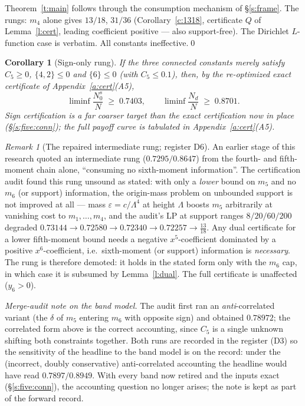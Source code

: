\documentclass[11pt]{article}
\numberwithin{equation}{section}
\newtheorem{corollary}[theorem]{Corollary}
\theoremstyle{definition}
\theoremstyle{remark}
\newtheorem{remark}[theorem]{Remark}
\begin{document}
Theorem~\ref{t:main} follows through the consumption mechanism of
\S\ref{s:frame}. The rungs: $m_4$ alone gives $13/18$, $31/36$
(Corollary~\ref{c:1318}, certificate $Q$ of Lemma~\ref{l:cert},
leading coefficient positive --- also support-free). The
Dirichlet $L$-function case is verbatim. All constants
ineffective.\qed

\begin{corollary}[Sign-only rung]\label{c:signs}
If the three connected constants merely satisfy $C_5\ge0$,
$\{4,2\}\le0$ and $\{6\}\le0$ (with $C_5\le0.1$), then, by the
re-optimized exact certificate of Appendix~\ref{a:cert}(A5),
\[
\liminf\frac{N_0^{s}}{N}\;\ge\;0.7403,\qquad
\liminf\frac{N_d}{N}\;\ge\;0.8701 .
\]
Sign certification is a far coarser target than the exact
certification now in place (\S\ref{s:five:conn}); the full
payoff curve is tabulated in Appendix~\ref{a:cert}(A5).
\end{corollary}

\begin{remark}[The repaired intermediate rung; register
D6]\label{r:rung}
An earlier stage of this research quoted an intermediate rung
($0.7295/0.8647$) from the fourth- and fifth-moment chain alone,
``consuming no sixth-moment information''. The certification
audit found this rung unsound as stated: with only a \emph{lower} bound on
$m_5$ and no $m_6$ (or support) information, the origin-mass
problem on unbounded support is not improved at all --- mass
$\varepsilon=c/\Lambda^{4}$ at height $\Lambda$ boosts $m_5$
arbitrarily at vanishing cost to $m_1,\dots,m_4$, and the audit's
LP at support ranges $8/20/60/200$ degraded
$0.73144\to0.72580\to0.72340\to0.72257\to\tfrac{13}{18}$. Any
dual certificate for a lower fifth-moment bound needs a negative
$x^5$-coefficient dominated by a positive $x^6$-coefficient, i.e.\
sixth-moment (or support) information is \emph{necessary}. The
rung is therefore demoted: it holds in the stated form only with
the $m_6$ cap, in which case it is subsumed by
Lemma~\ref{l:dual}. The full certificate is unaffected
($y_6>0$).
\end{remark}

\medskip
\noindent\emph{Merge-audit note on the band model.} The audit
first ran an \emph{anti}-correlated variant (the $\delta$ of
$m_5$ entering $m_6$ with opposite sign) and obtained $0.78972$;
the correlated form above is the correct accounting, since $C_5$
is a single unknown shifting both constraints together. Both runs
are recorded in the register (D3) so the sensitivity of the
headline to the band model is on the record: under the
(incorrect, doubly conservative) anti-correlated accounting the
headline would have read $0.7897/0.8949$. With every band now
retired and the inputs exact (\S\ref{s:five:conn}), the
accounting question no longer arises; the note is kept as part
of the forward record.
\end{document}
